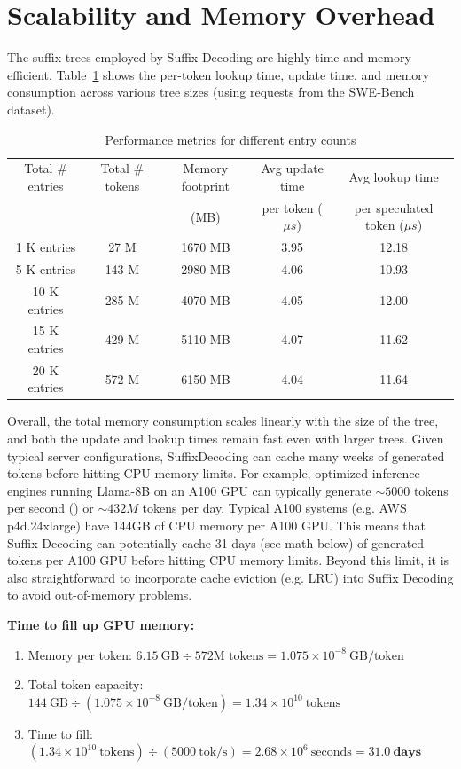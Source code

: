 \section{Scalability and Memory Overhead}
\label{sec:scalability-and-memory-overhead}

The suffix trees employed by Suffix Decoding are highly time and memory efficient. Table~\ref{tab:scalability} shows the per-token lookup time, update time, and memory consumption across various tree sizes (using requests from the SWE-Bench dataset). 

\begin{table}[h]
\centering
\caption{Performance metrics for different entry counts}
\label{tab:scalability}
\begin{tabular}{ccccc}
\toprule
Total \# entries & Total \# tokens & Memory footprint & Avg update time & Avg lookup time \\
                 &                 & (MB)             & per token ($\mu s$)  & per speculated token ($\mu s$) \\
\midrule
1 K entries & 27 M & 1670 MB & 3.95 & 12.18 \\
5 K entries & 143 M & 2980 MB & 4.06 & 10.93 \\
10 K entries & 285 M & 4070 MB & 4.05 & 12.00 \\
15 K entries & 429 M & 5110 MB & 4.07 & 11.62 \\
20 K entries & 572 M & 6150 MB & 4.04 & 11.64 \\
\bottomrule
\end{tabular}
\end{table}

Overall, the total memory consumption scales linearly with the size of the tree, and both the update and lookup times remain fast even with larger trees. Given typical server configurations, SuffixDecoding can cache many weeks of generated tokens before hitting CPU memory limits. For example, optimized inference engines running Llama-8B on an A100 GPU can typically generate $\sim 5000$ tokens per second (\citep{yin2024sglang}) or $\sim 432 M$ tokens per day. Typical A100 systems (e.g. AWS p4d.24xlarge) have 144GB of CPU memory per A100 GPU. This means that Suffix Decoding can potentially cache 31 days (see math below) of generated tokens per A100 GPU before hitting CPU memory limits. Beyond this limit, it is also straightforward to incorporate cache eviction (e.g. LRU) into Suffix Decoding to avoid out-of-memory problems.

\textbf{Time to fill up GPU memory:}
\begin{enumerate}
    \item Memory per token: $6.15~\text{GB} \div 572\text{M tokens} = 1.075 \times 10^{-8}~\text{GB/token}$
    \item Total token capacity: $144~\text{GB} \div (1.075 \times 10^{-8}~\text{GB/token}) = 1.34 \times 10^{10}~\text{tokens}$
    \item Time to fill: $(1.34 \times 10^{10}~\text{tokens}) \div (5000~\text{tok/s}) = 2.68 \times 10^{6}~\text{seconds} = \mathbf{31.0~\text{days}}$
\end{enumerate}

